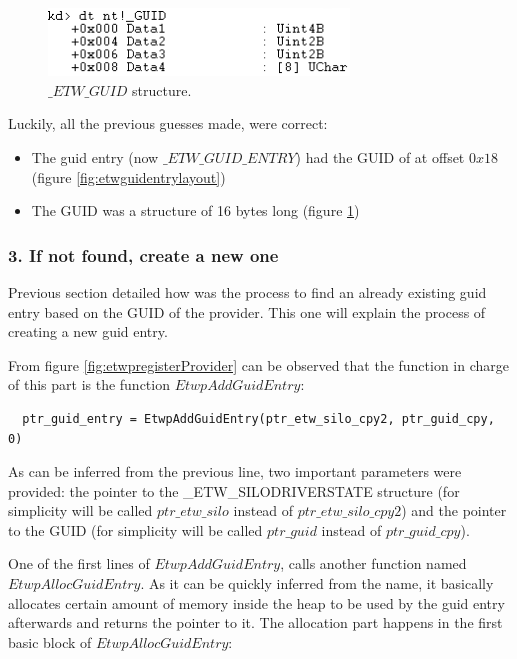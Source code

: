   \begin{centering}
    \begin{figure}[H]
      \includegraphics[width=8cm]{images/etwguidlayout.png}
      \caption[]{$\_ETW\_GUID$ structure.}
      \label{fig:guidlayout}
    \end{figure}
  \end{centering}
  
  Luckily, all the previous guesses made, were correct:
  \begin{itemize}
  \setlength\itemsep{0.05em}
    \item The guid entry (now $\_ETW\_GUID\_ENTRY$) had the GUID of at offset $0x18$ (figure \ref{fig:etwguidentrylayout})
    \item The GUID was a structure of 16 bytes long (figure \ref{fig:guidlayout})
  \end{itemize}




\subsubsection{\bfseries{3. If not found, create a new one}}
Previous section detailed how was the process to find an already existing guid entry based on the GUID of the provider. This one will explain the process of creating a new guid entry.

From figure \ref{fig:etwpregisterProvider} can be observed that the function in charge of this part is the function $EtwpAddGuidEntry$:

\begin{verbatim}
  ptr_guid_entry = EtwpAddGuidEntry(ptr_etw_silo_cpy2, ptr_guid_cpy, 0)
\end{verbatim}

As can be inferred from the previous line, two important parameters were provided: the pointer to the \_ETW\_SILODRIVERSTATE structure (for simplicity will be called $ptr\_etw\_silo$ instead of $ptr\_etw\_silo\_cpy2$) and the pointer to the GUID (for simplicity will be called $ptr\_guid$ instead of $ptr\_guid\_cpy$).

One of the first lines of $EtwpAddGuidEntry$, calls another function named $EtwpAllocGuidEntry$. As it can be quickly inferred from the name, it basically allocates certain amount of memory inside the heap to be used by the guid entry afterwards and returns the pointer to it. The allocation part happens in the first basic block of $EtwpAllocGuidEntry$:

